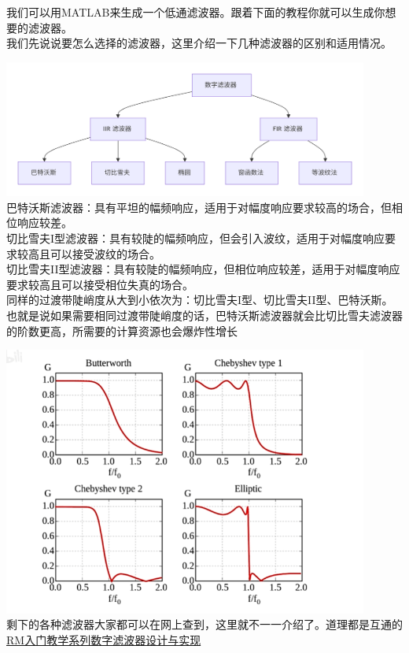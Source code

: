 \documentclass[UTF8,a4paper,12pt]{ctexart}
\begin{document}
       \begin{flushleft}
        我们可以用MATLAB来生成一个低通滤波器。跟着下面的教程你就可以生成你想要的滤波器。\\
        我们先说说要怎么选择的滤波器，这里介绍一下几种滤波器的区别和适用情况。\\
        \par \includegraphics[width=12cm]{picture/digital_filter.png}\\
        巴特沃斯滤波器：具有平坦的幅频响应，适用于对幅度响应要求较高的场合，但相位响应较差。\\
        切比雪夫I型滤波器：具有较陡的幅频响应，但会引入波纹，适用于对幅度响应要求较高且可以接受波纹的场合。\\
        切比雪夫II型滤波器：具有较陡的幅频响应，但相位响应较差，适用于对幅度响应要求较高且可以接受相位失真的场合。\\
        同样的过渡带陡峭度从大到小依次为：切比雪夫I型、切比雪夫II型、巴特沃斯。也就是说如果需要相同过渡带陡峭度的话，巴特沃斯滤波器就会比切比雪夫滤波器的阶数更高，所需要的计算资源也会爆炸性增长\\
        \par \includegraphics[width=12cm]{picture/filter_4.png}\\
        剩下的各种滤波器大家都可以在网上查到，这里就不一一介绍了。道理都是互通的\\
          \href{https://bbs.robomaster.com/wiki/4574/4064?source=7}{RM入门教学系列数字滤波器设计与实现}\\
        \end{flushleft}
\end{document}
